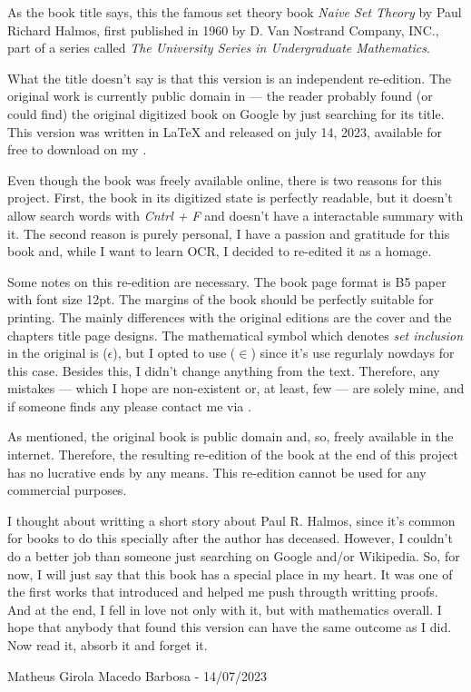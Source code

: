 As the book title says, this the famous set theory book \textit{Naive Set Theory} by Paul Richard Halmos, first published in 1960 by D. Van Nostrand Company, INC., part of a series called \textit{ The University Series in Undergraduate Mathematics}.

What the title doesn't say is that this version is an independent re-edition. The original work is currently public domain in \href{https://babel.hathitrust.org}{\color{blue}{Hathi Trust Digital Library}} — the reader probably found (or could find) the original digitized book on Google by just searching for its title. This version was written in LaTeX and released on july 14, 2023, available for free to download on my \href{https://github.com/matheusgirola/Halmos-Naive-Set-Theory-OCR-LaTeX-Reedition}{\color{blue}{Github repository}}.

Even though the book was freely available online, there is two reasons for this project. First, the book in its digitized state is perfectly readable, but it doesn't allow search words with \textit{Cntrl + F} and doesn't have a interactable summary with it. The second reason is purely personal, I have a passion and gratitude for this book and, while I want to learn OCR, I decided to re-edited it as a homage.

Some notes on this re-edition are necessary. The book page format is B5 paper with font size 12pt. The margins of the book should be perfectly suitable for printing. The mainly differences with the original editions are the cover and the chapters title page designs. The mathematical symbol which denotes \textit{set inclusion} in the original is ($\epsilon$), but I opted to use ($\in$) since it's use regurlaly nowdays for this case. Besides this, I didn't change anything from the text. Therefore, any mistakes — which I hope are non-existent or, at least, few —  are solely mine, and if someone finds any please contact me via  \href{mailto:matheusgirola@gmail.com}{\color{blue}{e-mail}}.

As mentioned, the original book is public domain and, so, freely available in the internet. Therefore, the resulting re-edition of the book at the end of this project has no lucrative ends by any means. This re-edition cannot be used for any commercial purposes.

I thought about writting a short story about Paul R. Halmos, since it's common for books to do this specially after the author has deceased. However, I couldn't do a better job than someone just searching on Google and/or Wikipedia. So, for now, I will just say that this book has a special place in my heart. It was one of the first works that introduced and helped me push througth writting proofs. And at the end, I fell in love not only with it, but with mathematics overall. I hope that anybody that found this version can have the same outcome as I did. Now read it, absorb it and forget it.

\begin{flushright}
Matheus Girola Macedo Barbosa - 14/07/2023
\end{flushright}
